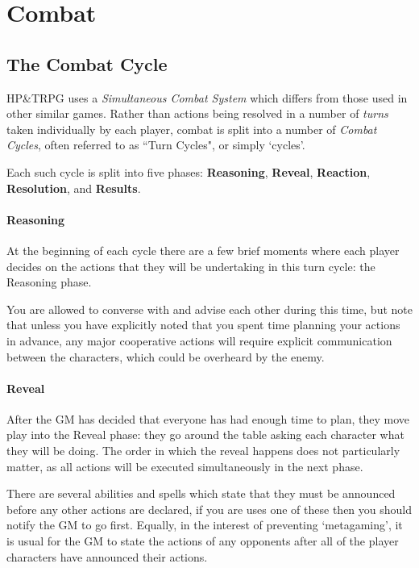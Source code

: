 
\chapter{Combat}

\section{The Combat Cycle}

HP\&TRPG uses a {\it Simultaneous Combat System} which differs from those used in other similar games. Rather than actions being resolved in a number of {\it turns} taken individually by each player, combat is split into a number of {\it Combat Cycles}, often referred to as ``Turn Cycles", or simply `cycles'. 

Each such cycle is split into five phases: {\bf Reasoning}, {\bf Reveal}, {\bf Reaction}, {\bf Resolution}, and {\bf Results}.

\subsubsection{Reasoning}

At the beginning of each cycle there are a few brief moments where each player decides on the actions that they will be undertaking in this turn cycle: the Reasoning phase. 

You are allowed to converse with and advise each other during this time, but note that unless you have explicitly noted that you spent time planning your actions in advance, any major cooperative actions will require explicit communication between the characters, which could be overheard by the enemy. 

\subsubsection{Reveal}

After the GM has decided that everyone has had enough time to plan, they move play into the Reveal phase: they go around the table asking each character what they will be doing. The order in which the reveal happens does not particularly matter, as all actions will be executed simultaneously in the next phase. 

There are several abilities and spells which state that they must be announced before any other actions are declared, if you are uses one of these then you should notify the GM to go first. Equally, in the interest of preventing `metagaming', it is usual for the GM to state the actions of any opponents after all of the player characters have announced their actions. 

